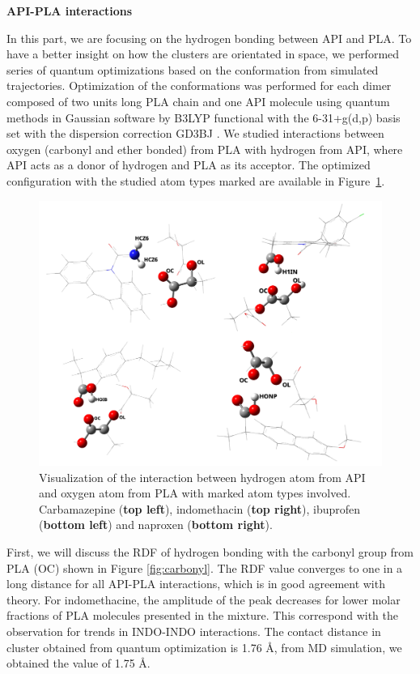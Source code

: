 \newpage
\textbf{API-PLA interactions}

In this part, we are focusing on the hydrogen bonding between API and PLA. To have a better insight on how the clusters are orientated in space, we performed series of quantum optimizations based on the conformation from simulated trajectories. Optimization of the conformations was performed for each dimer composed of two units long PLA chain and one API molecule using quantum methods in Gaussian\cite{frisch_gaussian16_2016} software by B3LYP functional with the 6-31+g(d,p) basis set with the dispersion correction GD3BJ \cite{smith_revised_2016}. We studied interactions between oxygen (carbonyl and ether bonded) from PLA with hydrogen from API, where API acts as a donor of hydrogen and PLA as its acceptor. The optimized configuration with the studied atom types marked are available in Figure~\ref{fig:contact}.


\vspace{-0.3cm}
\begin{figure}[htb!]
	\includegraphics[width=\linewidth]{img/all_pla_api_bp.png} 
	\vspace{-1cm}
	\caption{Visualization of the interaction between hydrogen atom from API and oxygen atom from PLA with marked atom types involved. Carbamazepine (\textbf{top left}), indomethacin (\textbf{top right}), ibuprofen (\textbf{bottom left}) and naproxen (\textbf{bottom right}).}
	\vspace{-0.3cm}
	\label{fig:contact}    
\end{figure}


First, we will discuss the RDF of hydrogen bonding with the carbonyl group from PLA (OC) shown in Figure \ref{fig:carbonyl}. The RDF value converges to one in a long distance for all API-PLA interactions, which is in good agreement with theory. For indomethacine, the amplitude of the peak decreases for lower molar fractions of PLA molecules presented in the mixture. This correspond with the observation for trends in INDO-INDO interactions. The contact distance in cluster obtained from quantum optimization is 1.76 \AA, from MD simulation, we obtained the value of 1.75 \AA.

